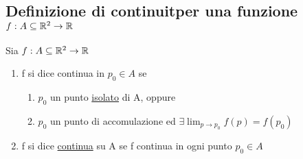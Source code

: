 \subsection{Definizione di continuit\aca per una funzione $f: A \subseteq \mathbb{R}^2 \to \mathbb{R}$}
\begin{definition}
  Sia $f: A \subseteq \mathbb{R}^2 \to \mathbb{R}$
  \begin{enumerate}
    \item f si dice continua in $p_0 \in A$ se 
    \begin{enumerate}
      \item $p_0$ \ace un punto \underline{isolato} di A, oppure
      \item $p_0$ \ace un punto di accomulazione ed $\exists \lim_{p \to p_0} f(p) = f(p_0)$
    \end{enumerate}
    \item f si dice \underline{continua} su A se f \ace continua in ogni punto $p_0 \in A$
  \end{enumerate}
\end{definition}